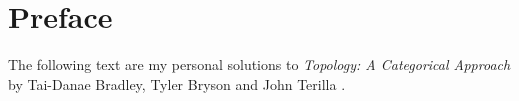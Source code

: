 \chapter{Preface}

The following text are my personal solutions to \emph{Topology: A Categorical Approach} by Tai-Danae Bradley, Tyler Bryson and John Terilla \cite{bradley_bryson_terilla_topolog_categorical_approach}.
